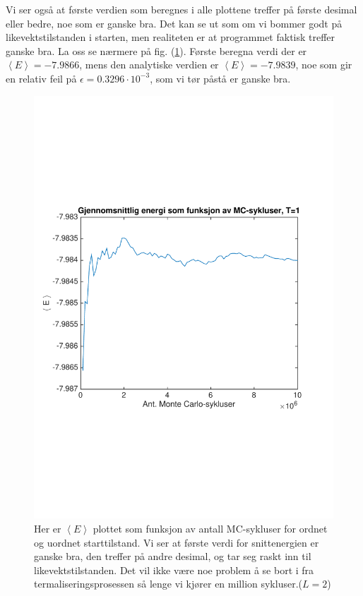 \documentclass[norsk, 10pt]{article}
\def\mean#1{\left\langle #1 \right\rangle}
\begin{document}
Vi ser også at første verdien som beregnes i alle plottene treffer på første desimal eller bedre, noe som er ganske bra. Det kan se ut som om vi bommer godt på likevektstilstanden i starten, men realiteten er at programmet faktisk treffer ganske bra. La oss se nærmere på fig. (\ref{fig:meanET1}). Første beregna verdi der er $\mean E = -7.9866$, mens den analytiske verdien er $\mean E = -7.9839$, noe som gir en relativ feil på $\epsilon = 0.3296 \cdot 10^{-3}$, som vi tør påstå er ganske bra.

\begin{figure}[H]
\centering
\includegraphics[scale = 0.5, trim = 1cm 8cm 1cm 8cm]{b_avgEnergy_MC_L2_T1.pdf}
\caption{Her er $\mean E$ plottet som funksjon av antall MC-sykluser for ordnet og uordnet starttilstand. Vi ser at første verdi for snittenergien er ganske bra, den treffer på andre desimal, og tar seg raskt inn til likevektstilstanden. Det vil ikke være noe problem å se bort i fra termaliseringsprosessen så lenge vi kjører en million sykluser.($L=2$)}
\label{fig:meanET1}
\end{figure}
\end{document}
